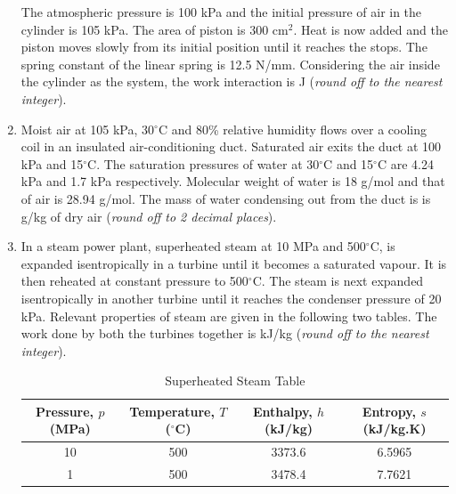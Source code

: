 \documentclass[12pt,onecolumn]{article}
\begin{document}
\begin{enumerate}
          The atmospheric pressure is 100 kPa and the initial pressure of air in the cylinder is 105 kPa. The area of piston is 300 cm$^2$. Heat is now added and the piston moves slowly from its initial position until it reaches the stops. The spring constant of the linear spring is 12.5 N/mm. Considering the air inside the cylinder as the system, the work interaction is \underline{\hspace{2cm}} J (\textit{round off to the nearest integer}).

    \item Moist air at 105 kPa, 30$^\circ$C and 80\% relative humidity flows over a cooling coil in an insulated air-conditioning duct. Saturated air exits the duct at 100 kPa and 15$^\circ$C. The saturation pressures of water at 30$^\circ$C and 15$^\circ$C are 4.24 kPa and 1.7 kPa respectively. Molecular weight of water is 18 g/mol and that of air is 28.94 g/mol. The mass of water condensing out from the duct is is \underline{\hspace{2cm}} g/kg of dry air (\textit{round off to 2 decimal places}).

    \item In a steam power plant, superheated steam at 10 MPa and 500$^\circ$C, is expanded isentropically in a turbine until it becomes a saturated vapour. It is then reheated at constant pressure to 500$^\circ$C. The steam is next expanded isentropically in another turbine until it reaches the condenser pressure of 20 kPa. Relevant properties of steam are given in the following two tables. The work done by both the turbines together is \underline{\hspace{2cm}} kJ/kg (\textit{round off to the nearest integer}).

          \begin{table}[H]
              \centering
              \begin{tabular}{|c|c|c|c|}
                  \hline
                  Pressure, $p$ (MPa) & Temperature, $T$ ($^\circ$C) & Enthalpy, $h$ (kJ/kg) & Entropy, $s$ (kJ/kg.K) \\
                  \hline
                  10                  & 500                          & 3373.6                & 6.5965                 \\\hline
                  1                   & 500                          & 3478.4                & 7.7621                 \\\hline
              \end{tabular}
              \caption{Superheated Steam Table}
              \label{tab:q54a}
          \end{table}



\end{enumerate}
\end{document}
